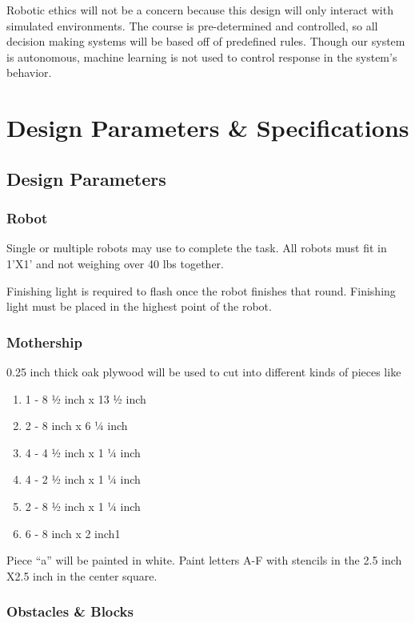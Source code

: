 \documentclass[12pt]{article}
\begin{document}
Robotic ethics will not be a concern because this design will only interact with simulated environments. The course is pre-determined and controlled, so all decision making systems will be based off of predefined rules. Though our system is autonomous, machine learning is not used to control response in the system’s behavior.

\section{Design Parameters \& Specifications}
\subsection{Design Parameters}

\subsubsection{Robot}

Single or multiple robots may use to complete the task. All robots must fit in 1’X1’ and not weighing over 40 lbs together.

Finishing light is required to flash once the robot finishes that round. Finishing light must be placed in the highest point of the robot.

\subsubsection{Mothership}

0.25 inch thick oak plywood will be used to cut into different kinds of pieces like 

\begin{enumerate}[noitemsep]
	\item 1 - 8 ½ inch x 13 ½ inch 
	\item 2 - 8 inch x 6 ¼ inch 
	\item 4 - 4 ½ inch x 1 ¼ inch 
	\item 4 - 2 ½ inch x 1 ¼ inch 
	\item 2 - 8 ½ inch x 1 ¼ inch 
	\item 6 - 8 inch x 2 inch1
\end{enumerate}

Piece “a” will be painted in white. Paint letters A-F with stencils in the 2.5 inch X2.5 inch in the center square.

\subsubsection{Obstacles \& Blocks}
\end{document}
